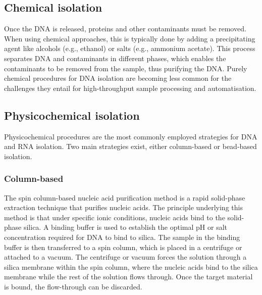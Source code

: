 \documentclass[
]{book}
\begin{document}
\hypertarget{chemical-isolation}{%
\subsection*{Chemical isolation}\label{chemical-isolation}}

Once the DNA is released, proteins and other contaminants must be removed. When using chemical approaches, this is typically done by adding a precipitating agent like alcohols (e.g., ethanol) or salts (e.g., ammonium acetate). This process separates DNA and contaminants in different phases, which enables the contaminants to be removed from the sample, thus purifying the DNA. Purely chemical procedures for DNA isolation are becoming less common for the challenges they entail for high-throughput sample processing and automatisation.

\hypertarget{physicochemical-isolation}{%
\subsection*{Physicochemical isolation}\label{physicochemical-isolation}}

Physicochemical procedures are the most commonly employed strategies for DNA and RNA isolation. Two main strategies exist, either column-based or bead-based isolation.

\hypertarget{column-based}{%
\subsubsection*{Column-based}\label{column-based}}

The spin column-based nucleic acid purification method is a rapid solid-phase extraction technique that purifies nucleic acids. The principle underlying this method is that under specific ionic conditions, nucleic acids bind to the solid-phase silica. A binding buffer is used to establish the optimal pH or salt concentration required for DNA to bind to silica. The sample in the binding buffer is then transferred to a spin column, which is placed in a centrifuge or attached to a vacuum. The centrifuge or vacuum forces the solution through a silica membrane within the spin column, where the nucleic acids bind to the silica membrane while the rest of the solution flows through. Once the target material is bound, the flow-through can be discarded.
\end{document}
